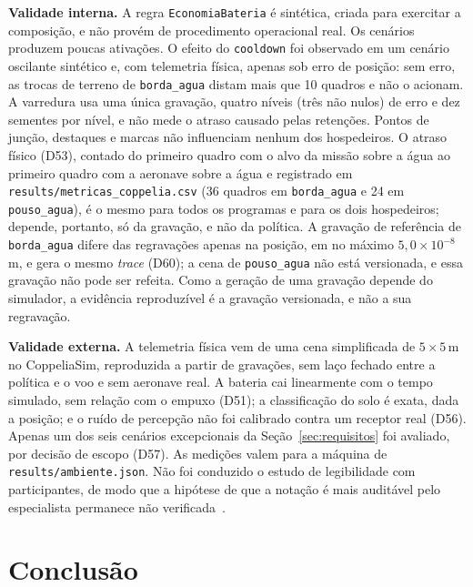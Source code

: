 \documentclass[conference]{IEEEtran}
\begin{document}
\textbf{Validade interna.} A regra \texttt{EconomiaBateria} é sintética, criada
para exercitar a composição, e não provém de procedimento operacional real. Os
cenários produzem poucas ativações. O efeito do \texttt{cooldown} foi observado
em um cenário oscilante sintético e, com telemetria física, apenas sob erro de
posição: sem erro, as trocas de terreno de \texttt{borda\_agua} distam mais que
10 quadros e não o acionam. A varredura usa uma única gravação, quatro níveis (três não nulos) de
erro e dez sementes por nível, e não mede o atraso causado pelas retenções.
Pontos de junção, destaques e marcas não influenciam nenhum dos hospedeiros. O
atraso físico (D53), contado do primeiro quadro com o alvo da missão sobre a água ao primeiro quadro com a aeronave sobre a água e registrado em \texttt{results/metricas\_coppelia.csv} (36 quadros
em \texttt{borda\_agua} e 24 em \texttt{pouso\_agua}), é o mesmo para todos os
programas e para os dois hospedeiros; depende, portanto, só da gravação, e não
da política. A gravação de referência de \texttt{borda\_agua} difere das regravações apenas
na posição, em no máximo $5{,}0 \times 10^{-8}$\,m, e gera o mesmo
\textit{trace} (D60); a cena de \texttt{pouso\_agua} não está versionada, e
essa gravação não pode ser refeita. Como a geração de uma gravação depende do
simulador, a evidência reproduzível é a gravação versionada, e não a sua
regravação.

\textbf{Validade externa.} A telemetria física vem de uma cena simplificada de
$5 \times 5$\,m no CoppeliaSim, reproduzida a partir de gravações, sem laço
fechado entre a política e o voo e sem aeronave real. A bateria cai
linearmente com o tempo simulado, sem relação com o empuxo (D51); a
classificação do solo é exata, dada a posição; e o ruído de percepção não foi
calibrado contra um receptor real (D56). Apenas um dos seis
cenários excepcionais da Seção~\ref{sec:requisitos} foi avaliado, por decisão
de escopo (D57). As medições valem para a máquina de
\texttt{results/ambiente.json}. Não foi conduzido o estudo de legibilidade com
participantes, de modo que a hipótese de que a notação é mais auditável pelo
especialista permanece não verificada~\cite{rodrigues2017}.

\section{Conclusão}
\label{sec:conclusao}
\end{document}
